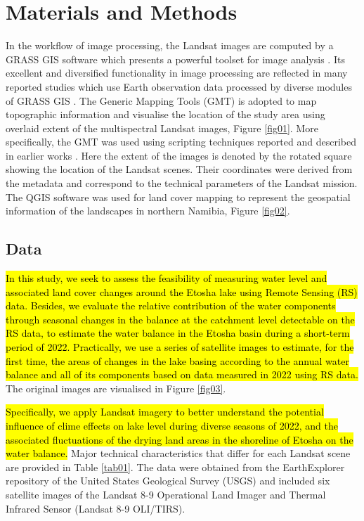 \documentclass[climate,article,submit,pdftex,moreauthors]{Definitions/mdpi}
\begin{document}
\section{Materials and Methods}
 
In the workflow of image processing, the Landsat images are computed by a GRASS GIS software which presents a powerful toolset for image analysis \cite{GRASS_GIS_software}. Its excellent and diversified functionality in image processing are reflected in many reported studies which use Earth observation data processed by diverse modules of GRASS GIS \cite{HOFIERKA2009387,lemenkova2024exploitation,Lemenkova202320,ROCCHINI201382,Lemenkova202313,JASIEWICZ20111162}. The Generic Mapping Tools (GMT) \cite{Wessel} is adopted to map topographic information and visualise the location of the study area using overlaid extent of the multispectral Landsat images, Figure \ref{fig01}. More specifically, the GMT was used using scripting techniques reported and described in earlier works \cite{Lemenkova202203,Lemenkova202217}. Here the extent of the images is denoted by the rotated square showing the location of the Landsat scenes. Their coordinates were derived from the metadata and correspond to the technical parameters of the Landsat mission. The QGIS software was used for land cover mapping to represent the geospatial information of the landscapes in northern Namibia, Figure \ref{fig02}. 

\subsection{Data}
\hl{In this study, we seek to assess the feasibility of measuring  water level and associated land cover changes around the Etosha lake using Remote Sensing (RS) data. Besides, we evaluate the relative contribution of the water components through seasonal changes in the balance at the catchment level detectable on the RS data, to estimate the water balance in the Etosha basin during a short-term period of 2022. Practically, we use a series of satellite images to estimate, for the first time, the areas of changes in the lake basing according to the annual water balance and all of its components based on data measured in 2022 using RS data.} The original images are visualised in Figure \ref{fig03}. 

\hl{Specifically, we apply Landsat imagery to better understand the potential influence of clime effects on lake level during diverse seasons of 2022, and the associated fluctuations of the drying land areas in the shoreline of Etosha on the water balance. }Major technical characteristics that differ for each Landsat scene are provided in Table \ref{tab01}. The data were obtained from the EarthExplorer repository of the United States Geological Survey (USGS) and included six satellite images of the Landsat 8-9 Operational Land Imager and Thermal Infrared Sensor (Landsat 8-9 OLI/TIRS). 
\end{document}
